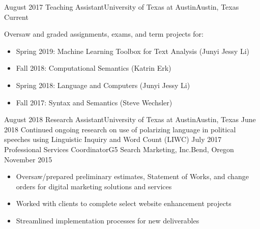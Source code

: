%
%
%
\begin{experiences}
  \experience
    {August 2017}   {Teaching Assistant}{University of Texas at Austin}{Austin, Texas}
    {Current} { Oversaw and graded assignments, exams, and term projects for:
                      \begin{itemize}
                        \item Spring 2019: Machine Learning Toolbox for Text Analysis (Junyi Jessy Li) 
                        \item Fall 2018: Computational Semantics (Katrin Erk) 
                        \item Spring 2018: Language and Computers (Junyi Jessy Li)  
                        \item Fall 2017: Syntax and Semantics (Steve Wechsler)  
                      \end{itemize}
                    }
  \emptySeparator
  \experience
    {August 2018} {Research Assistant}{University of Texas at Austin}{Austin, Texas}
    {June 2018}    { Continued ongoing research on use of polarizing language in political speeches using Linguistic Inquiry and Word Count (LIWC)  }
  \emptySeparator
  \experience
    {July 2017}     {Professional Services Coordinator}{G5 Search Marketing, Inc.}{Bend, Oregon}
    {November 2015}    {
                      \begin{itemize}
                        \item Oversaw/prepared preliminary estimates, Statement of Works, and change orders for digital marketing solutions and services 
                        \item Worked with clients to  complete select website enhancement projects 
                        \item Streamlined implementation processes for new deliverables


\end{itemize}}
\end{experiences}
